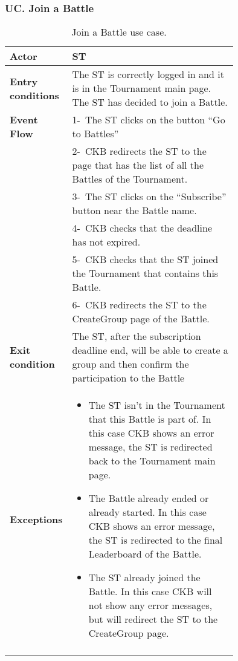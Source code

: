 \subsubsection*{UC\cuc . Join a Battle}
\begin{center}
    \begin{longtable}{|l|p{0.75\linewidth}|}
        \hline
        \textbf{Actor}            & ST \\
        \hline
        \textbf{Entry conditions} & The ST is correctly logged in and it is in the Tournament main page. The ST has decided to join a Battle.        \\
        \hline
        \textbf{Event Flow}       & 1-\ The ST clicks on the button “Go to Battles”        \\
        & 2-\ CKB redirects the ST to the page that has the list of all the Battles of the Tournament.        \\
        & 3-\ The ST clicks on the “Subscribe” button near the Battle name.        \\
        & 4-\ CKB checks that the deadline has not expired.\\
        & 5-\ CKB checks that the ST joined the Tournament that contains this Battle.   \\
        & 6-\ CKB redirects the ST to the CreateGroup page of the Battle.        \\
        \hline
        \textbf{Exit condition}   & The ST, after the subscription deadline end, will be able to create a group and then confirm the participation to the Battle        \\
        \hline
        \textbf{Exceptions}        & \begin{itemize}
            \item The ST isn’t in the Tournament that this Battle is part of. In this case CKB shows an error message, the ST is redirected back to the Tournament main page.
            \item The Battle already ended or already started. In this case  CKB shows an error message, the ST is redirected to the final Leaderboard of the Battle.
            \item The ST already joined the Battle. In this case CKB will not show any error messages, but will redirect the ST to the CreateGroup page.
         \end{itemize}    \\
        \hline
        \caption{Join a Battle use case.}
        \label{tab: join_a_Battle_use_case}
    \end{longtable}
\end{center}

